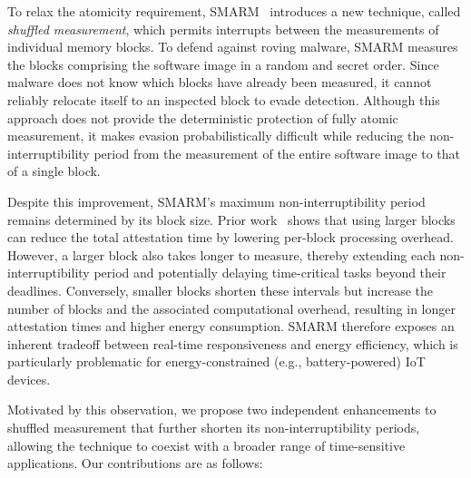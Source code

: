 \documentclass[conference]{IEEEtran}
\begin{document}
To relax the atomicity requirement, SMARM~\cite{carpent2018smarm} introduces a new technique, called \emph{shuffled measurement}, which permits interrupts between the measurements of individual memory blocks. To defend against roving malware, SMARM measures the blocks comprising the software image in a random and secret order. Since malware does not know which blocks have already been measured, it cannot reliably relocate itself to an inspected block to evade detection. Although this approach does not provide the deterministic protection of fully atomic measurement, it makes evasion probabilistically difficult while reducing the non-interruptibility period from the measurement of the entire software image to that of a single block.

Despite this improvement, SMARM's maximum non-interruptibility period remains determined by its block size. Prior work~\cite{smarmplus2026,carpent2018smarm} shows that using larger blocks can reduce the total attestation time by lowering per-block processing overhead. However, a larger block also takes longer to measure, thereby extending each non-interruptibility period and potentially delaying time-critical tasks beyond their deadlines. Conversely, smaller blocks shorten these intervals but increase the number of blocks and the associated computational overhead, resulting in longer attestation times and higher energy consumption. SMARM therefore exposes an inherent tradeoff between real-time responsiveness and energy efficiency, which is particularly problematic for energy-constrained (e.g., battery-powered) IoT devices.


Motivated by this observation, we propose two independent enhancements to shuffled measurement that further shorten its non-interruptibility periods, allowing the technique to coexist with a broader range of time-sensitive applications.
Our contributions are as follows:
\end{document}
